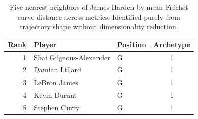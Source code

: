 \begin{table}[htbp]
  \centering\small
  \begin{tabular}{rllc}
    \toprule
    Rank & Player & Position & Archetype \\
    \midrule
    1 & Shai Gilgeous-Alexander & G & 1 \\
    2 & Damian Lillard & G & 1 \\
    3 & LeBron James & G & 1 \\
    4 & Kevin Durant & G & 1 \\
    5 & Stephen Curry & G & 1 \\
    \bottomrule
  \end{tabular}
  \caption{Five nearest neighbors of James Harden by mean Fr\'{e}chet curve distance across metrics. Identified purely from trajectory shape without dimensionality reduction.}
  \label{tab:James_Harden_frechet_curve_neighbors}
\end{table}

